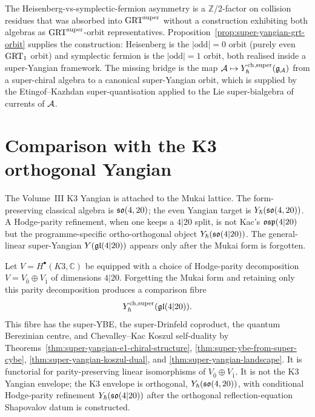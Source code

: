 \begin{remark}
\label{rem:fm230-closed}
The Heisenberg-vs-symplectic-fermion
asymmetry is a $\mathbb{Z}/2$-factor on collision residues that was
absorbed into $\mathrm{GRT}^{\mathrm{super}}$ without a construction exhibiting both algebras
as $\mathrm{GRT}^{\mathrm{super}}$-orbit representatives. Proposition~\ref{prop:super-yangian-grt-orbit}
supplies the construction: Heisenberg is the $|\mathrm{odd}|=0$ orbit
(purely even $\mathrm{GRT}_1$ orbit) and symplectic fermion is the $|\mathrm{odd}|=1$
orbit, both realised inside a super-Yangian framework. The missing
bridge is the map
$\mathcal{A} \mapsto Y^{\mathrm{ch},\mathrm{super}}_{\hbar}(\mathfrak{g}_{\mathcal{A}})$ from a super-chiral algebra to a
canonical super-Yangian orbit, which is supplied by the
Etingof--Kazhdan super-quantisation applied to the Lie super-bialgebra
of currents of $\mathcal{A}$.
\end{remark}

\section{Comparison with the K3 orthogonal Yangian}
\label{sec:super-vol3-bridge}

The Volume~III K3 Yangian is attached to the Mukai lattice. The
form-preserving classical algebra is $\mathfrak{so}(4,20)$; the even Yangian
target is $Y_{\hbar}(\mathfrak{so}(4,20))$. A Hodge-parity refinement, when one
keeps a $4|20$ split, is not Kac's $\mathfrak{osp}(4|20)$ but the
programme-specific ortho-orthogonal object $Y_{\hbar}(\mathfrak{so}(4|20))$.
The general-linear super-Yangian $Y(\mathfrak{gl}(4|20))$ appears only after the
Mukai form is forgotten.

\begin{proposition}
\label{prop:vol3-upgrade}
Let $V = H^\bullet(K3,\mathbb{C})$ be equipped with a choice of
Hodge-parity decomposition $V = V_{\bar 0}\oplus V_{\bar 1}$ of
dimensions $4|20$. Forgetting the Mukai form and retaining only this
parity decomposition produces a comparison fibre
\[
 Y^{\mathrm{ch},\mathrm{super}}_{\hbar}(\mathfrak{gl}(4|20)).
\]
This fibre has the super-YBE, the super-Drinfeld coproduct, the quantum
Berezinian centre, and Chevalley--Kac Koszul self-duality by
Theorems~\ref{thm:super-yangian-e1-chiral-structure},
\ref{thm:super-ybe-from-super-cybe},
\ref{thm:super-yangian-koszul-dual}, and
\ref{thm:super-yangian-landscape}. It is functorial for
parity-preserving linear isomorphisms of $V_{\bar0}\oplus V_{\bar1}$.
It is not the K3 Yangian envelope; the K3 envelope is orthogonal,
$Y_{\hbar}(\mathfrak{so}(4,20))$, with conditional Hodge-parity refinement
$Y_{\hbar}(\mathfrak{so}(4|20))$ after the orthogonal reflection-equation
Shapovalov datum is constructed.
\end{proposition}

